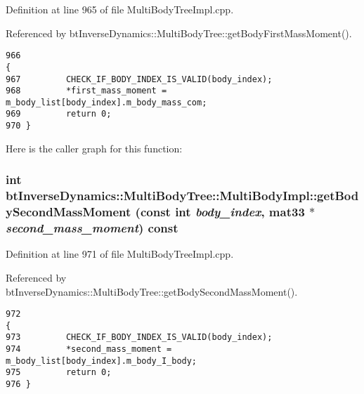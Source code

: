  

Definition at line 965 of file MultiBodyTreeImpl.cpp.

Referenced by btInverseDynamics::MultiBodyTree::getBodyFirstMassMoment().

\begin{Code}\begin{verbatim}966                                                                                                                                                 {
967         CHECK_IF_BODY_INDEX_IS_VALID(body_index);
968         *first_mass_moment = m_body_list[body_index].m_body_mass_com;
969         return 0;
970 }
\end{verbatim}
\end{Code}




Here is the caller graph for this function:\hypertarget{classbt_inverse_dynamics_1_1_multi_body_tree_1_1_multi_body_impl_8e530e85b355eb2bee0bdd3256529e28}{
\subsubsection[getBodySecondMassMoment]{\setlength{\rightskip}{0pt plus 5cm}int btInverseDynamics::MultiBodyTree::MultiBodyImpl::getBodySecondMassMoment (const int {\em body\_\-index}, \/  mat33 $\ast$ {\em second\_\-mass\_\-moment}) const}}
\label{classbt_inverse_dynamics_1_1_multi_body_tree_1_1_multi_body_impl_8e530e85b355eb2bee0bdd3256529e28}


 

Definition at line 971 of file MultiBodyTreeImpl.cpp.

Referenced by btInverseDynamics::MultiBodyTree::getBodySecondMassMoment().

\begin{Code}\begin{verbatim}972                                                                                                                                                    {
973         CHECK_IF_BODY_INDEX_IS_VALID(body_index);
974         *second_mass_moment = m_body_list[body_index].m_body_I_body;
975         return 0;
976 }
\end{verbatim}
\end{Code}




